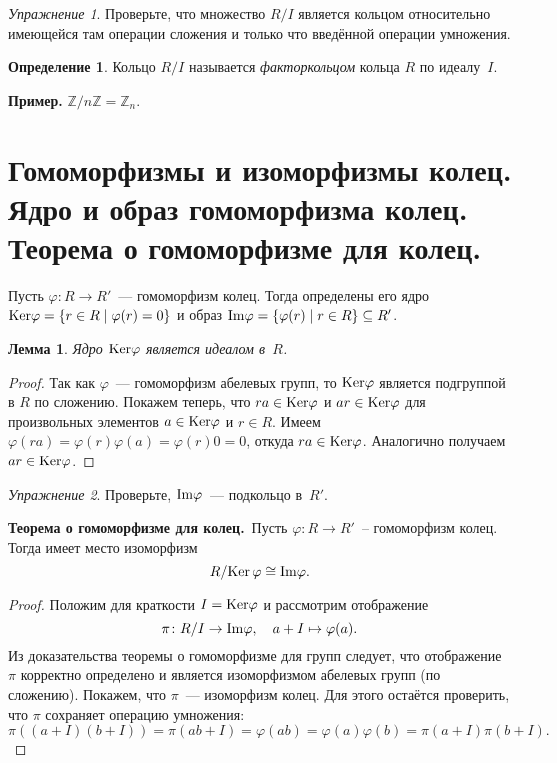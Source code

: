 \documentclass[a4paper, 12pt]{article}
\def\Ker{{\rm Ker}}%
\def\Im{{\rm Im}}%
\def\ZZ{{\mathbb Z}}%
\newtheorem{lemma}{Лемма}
\theoremstyle{definition}
\newtheorem{definition}{Определение}
\theoremstyle{remark}
\newtheorem{exercise}{Упражнение}
\begin{document}
\begin{exercise}
Проверьте, что множество $R/I$ является кольцом относительно
имеющейся там операции сложения и только что введённой операции
умножения.
\end{exercise}

\begin{definition}
Кольцо $R/I$ называется {\it факторкольцом} кольца $R$ по
идеалу~$I$.
\end{definition}

\textbf{Пример.} $\ZZ / n \ZZ = \ZZ_n$.


\section{Гомоморфизмы и изоморфизмы колец. Ядро и образ гомоморфизма колец. Теорема о гомоморфизме для колец.}

Пусть $\varphi\colon R\to R'$~--- гомоморфизм колец. Тогда
определены его ядро $\Ker \varphi = \lbrace r \in R \mid \varphi(r)
= 0 \rbrace$ и образ $\Im \varphi = \lbrace \varphi(r) \mid r \in R
\rbrace \subseteq R'$.

\begin{lemma}
Ядро $\Ker \varphi$ является идеалом в~$R$.
\end{lemma}

\begin{proof}
Так как $\varphi$~--- гомоморфизм абелевых групп, то $\Ker \varphi$
является подгруппой в $R$ по сложению. Покажем теперь, что $ra \in
\Ker \varphi$ и $ar \in \Ker \varphi$ для произвольных элементов $a
\in \Ker \varphi$ и $r \in R$. Имеем $\varphi(ra) = \varphi(r)
\varphi(a) = \varphi(r) 0 = 0$, откуда $ra \in \Ker \varphi$.
Аналогично получаем $ar \in \Ker \varphi$.
\end{proof}

\begin{exercise}
Проверьте, $\Im \varphi$~--- подкольцо в~$R'$.
\end{exercise}

\smallskip

{\bf Теорема о гомоморфизме для колец.}\ Пусть $\varphi\colon R\to
R'$~-- гомоморфизм колец. Тогда имеет место изоморфизм
$$
R/\Ker\,\varphi\cong\Im\varphi.
$$

\smallskip

\begin{proof}
Положим для краткости $I = \Ker \varphi$ и рассмотрим отображение
$$
\pi \colon R/I \to \Im \varphi, \quad a+I \mapsto \varphi(a).
$$
Из доказательства теоремы о гомоморфизме для групп следует, что
отображение $\pi$ корректно определено и является изоморфизмом
абелевых групп (по сложению). Покажем, что $\pi$~--- изоморфизм
колец. Для этого остаётся проверить, что $\pi$ сохраняет операцию
умножения:
$$
\pi((a+I)(b+I)) = \pi(ab+I) = \varphi(ab) = \varphi(a) \varphi(b) =
\pi(a+I) \pi(b+I).
$$
\end{proof}
\end{document}

